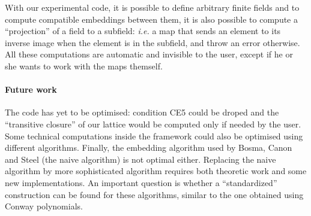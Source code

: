 \documentclass[12pt]{article}
\newcommand{\ie}{\emph{i.e. }}
\begin{document}
With our experimental code, it is possible to define arbitrary finite fields and
to compute compatible embeddings between them, it is also possible to compute a ``projection'' of a
field to a subfield: \ie a map that sends an element to its inverse image when
the element is in the subfield, and throw an error otherwise. All these
computations are automatic and invisible to the user, except if he or she wants
to work with the maps themself.

\paragraph{Future work}

The code has yet to be optimised: condition CE5 could be droped and the
``transitive closure'' of our lattice would be computed only if needed by the
user. Some technical computations inside the framework could also be optimised
using different algorithms. Finally, the embedding algorithm used by Bosma,
Canon and Steel (the naive algorithm) is not optimal either. Replacing the naive
algorithm by more sophisticated algorithm requires both theoretic work and some
new implementations. An important question is whether a ``standardized''
construction can be found for these algorithms, similar to the one obtained
using Conway polynomials.



\end{document}
